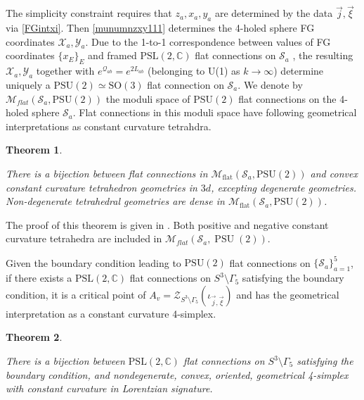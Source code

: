 \documentclass[aps,prd,notitlepage,nofootinbib,superscriptaddress,groupedaddress,twocolumn]{revtex4-1}
\newtheorem{theorem}{Theorem}[section]
\newcommand{\PSlc}{\mathrm{PSL}(2,\mathbb{C})}
\newcommand{\PSu}{\mathrm{PSU}(2)}
\newcommand{\cs}{\mathcal S}
\newcommand{\cx}{\mathcal X}
\newcommand{\cy}{\mathcal Y}
\newcommand{\cz}{\mathcal Z}
\newcommand{\scrq}{\mathscr{Q}}
\newcommand{\G}{\Gamma}
\begin{document}
The simplicity constraint requires that $z_{a}, x_{a}, y_{a}$ are determined by the data $\vec{j}, \vec{\xi}$ via \eqref{FGintxi}. Then \eqref{munumnzxy111} determines the 4-holed sphere FG coordinates $\cx_a,\cy_a$. Due to the 1-to-1 correspondence between values of FG coordinates $\{x_{E}\}_E$ and framed $\PSlc$ flat connections on $\cs_a$ \cite{FG03}, the resulting $\cx_a,\cy_a$ together with $e^{\scrq_{ab}}=e^{2L_{ab}}$ (belonging to U(1) as $k\to\infty$) determine uniquely a $\PSu\simeq \mathrm{SO}(3)$ flat connection on $\cs_a$. %
We denote by $\mathcal{M}_{flat}\left(\mathcal{S}_{a}, \mathrm{PSU}(2)\right)$ the moduli space of $\PSu$ flat connections on the 4-holed sphere $\cs_a$. Flat connections in this moduli space have following geometrical interpretations as constant curvature tetrahdra. 

\begin{theorem} \label{tetracorresp}

There is a bijection between flat connections in $\mathcal{M}_{\text {flat}}\left(\mathcal{S}_{a}, \mathrm{PSU}(2)\right)$ and convex constant curvature tetrahedron geometries in $3 d$, excepting degenerate geometries. Non-degenerate tetrahedral geometries are dense in $\mathcal{M}_{\text {flat}}\left(\mathcal{S}_{a}, \mathrm{PSU}(2)\right)$.

\end{theorem}

The proof of this theorem is given in \cite{curvedMink}. %
Both positive and negative constant curvature tetrahedra are included in $\mathcal{M}_{flat}\left(\mathcal{S}_{a}, \operatorname{PSU}(2)\right)$. 

Given the boundary condition leading to $\PSu$ flat connections on $\{\cs_a\}_{a=1}^5$, if there exists a $\PSlc$ flat connections on $S^3\setminus\G_5$ satisfying the boundary condition, it is a critical point of $A_v=\cz_{S^3\setminus\G_5}(\iota_{\vec{j},\vec{\xi}})$ and has the geometrical interpretation as a constant curvature 4-simplex. 

\begin{theorem} \label{tetrareconstr}

	There is a bijection between $\PSlc$ flat connections on $S^3\setminus\G_5$ satisfying the boundary condition, and nondegenerate, convex, oriented, geometrical 4-simplex with constant curvature in Lorentzian signature. 

\end{theorem}
\end{document}
